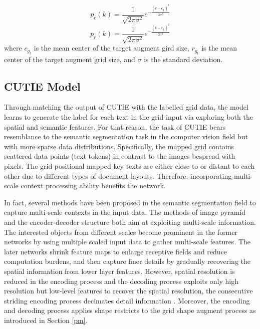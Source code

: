 \documentclass[10pt,twocolumn,letterpaper]{article}
\begin{document}
\begin{equation}
\label{augmentc}
p_c(k) = \frac{1}{\sqrt{2 \pi \sigma^2}} e^{- \frac{(k - c_{g_t})^2}{2 \sigma^2}}
\end{equation}
\begin{equation}
\label{augmentr}
p_r(k) = \frac{1}{\sqrt{2 \pi \sigma^2}} e^{- \frac{(k - r_{g_t})^2}{2 \sigma^2}}
\end{equation}
where $c_{g_t}$ is the mean center of the target augment gird size, $r_{g_t}$ is the mean center of the target augment grid size, and $\sigma$ is the standard deviation.


\subsection{CUTIE Model}
Through matching the output of CUTIE with the labelled grid data, the model learns to generate the label for each text in the grid input via exploring both the spatial and semantic features. For that reason, the task of CUTIE bears resemblance to the semantic segmentation task in the computer vision field but with more sparse data distributions. Specifically, the mapped grid contains scattered data points (text tokens) in contrast to the images bespread with pixels. The grid positional mapped key texts are either close to or distant to each other due to different types of document layouts. Therefore, incorporating multi-scale context processing ability benefits the network.

In fact, several methods have been proposed in the semantic segmentation field to capture multi-scale contexts in the input data. The methods of image pyramid and the encoder-decoder structure both aim at exploiting multi-scale information. The interested objects from different scales become prominent in the former networks by using multiple scaled input data to gather multi-scale features. The later networks shrink feature maps to enlarge receptive fields and reduce computation burdens, and then capture finer details by gradually recovering the spatial information from lower layer features. However, spatial resolution is reduced in the encoding process and the decoding process exploits only high resolution but low-level features to recover the spatial resolution, the consecutive striding encoding process decimates detail information \cite{hrnet}. Moreover, the encoding and decoding process applies shape restricts to the grid shape augment process as introduced in Section \ref{pm}. 
\end{document}
